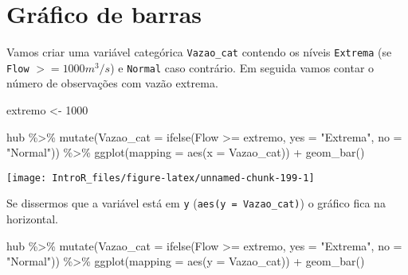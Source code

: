 \documentclass[
]{book}
\newenvironment{Shaded}{\begin{snugshade}}{\end{snugshade}}
\newcommand{\AttributeTok}[1]{\textcolor[rgb]{0.77,0.63,0.00}{#1}}
\newcommand{\DecValTok}[1]{\textcolor[rgb]{0.00,0.00,0.81}{#1}}
\newcommand{\FunctionTok}[1]{\textcolor[rgb]{0.00,0.00,0.00}{#1}}
\newcommand{\NormalTok}[1]{#1}
\newcommand{\OtherTok}[1]{\textcolor[rgb]{0.56,0.35,0.01}{#1}}
\newcommand{\SpecialCharTok}[1]{\textcolor[rgb]{0.00,0.00,0.00}{#1}}
\newcommand{\StringTok}[1]{\textcolor[rgb]{0.31,0.60,0.02}{#1}}
\begin{document}
\hypertarget{gruxe1fico-de-barras-2}{%
\section{Gráfico de barras}\label{gruxe1fico-de-barras-2}}

Vamos criar uma variável categórica \texttt{Vazao\_cat} contendo os níveis \texttt{Extrema} (se \texttt{Flow} \(>= 1000 m^3/s\)) e \texttt{Normal} caso contrário. Em seguida vamos contar o número de observações com vazão extrema.

\begin{Shaded}
\begin{Highlighting}[]
\NormalTok{extremo }\OtherTok{\textless{}{-}} \DecValTok{1000}

\NormalTok{hub }\SpecialCharTok{\%\textgreater{}\%} 
  \FunctionTok{mutate}\NormalTok{(}\AttributeTok{Vazao\_cat =} \FunctionTok{ifelse}\NormalTok{(Flow }\SpecialCharTok{\textgreater{}=}\NormalTok{ extremo, }
                            \AttributeTok{yes =} \StringTok{"Extrema"}\NormalTok{, }
                            \AttributeTok{no =} \StringTok{"Normal"}\NormalTok{)) }\SpecialCharTok{\%\textgreater{}\%} 
  \FunctionTok{ggplot}\NormalTok{(}\AttributeTok{mapping =} \FunctionTok{aes}\NormalTok{(}\AttributeTok{x =}\NormalTok{ Vazao\_cat)) }\SpecialCharTok{+}
  \FunctionTok{geom\_bar}\NormalTok{()}
\end{Highlighting}
\end{Shaded}

\begin{center}\texttt{[image: IntroR\_files/figure-latex/unnamed-chunk-199-1]} \end{center}

Se dissermos que a variável está em \texttt{y} (\texttt{aes(y\ =\ Vazao\_cat)}) o gráfico fica na horizontal.

\begin{Shaded}
\begin{Highlighting}[]
\NormalTok{hub }\SpecialCharTok{\%\textgreater{}\%} 
  \FunctionTok{mutate}\NormalTok{(}\AttributeTok{Vazao\_cat =} \FunctionTok{ifelse}\NormalTok{(Flow }\SpecialCharTok{\textgreater{}=}\NormalTok{ extremo, }\AttributeTok{yes =} \StringTok{"Extrema"}\NormalTok{, }\AttributeTok{no =} \StringTok{"Normal"}\NormalTok{)) }\SpecialCharTok{\%\textgreater{}\%} 
  \FunctionTok{ggplot}\NormalTok{(}\AttributeTok{mapping =} \FunctionTok{aes}\NormalTok{(}\AttributeTok{y =}\NormalTok{ Vazao\_cat)) }\SpecialCharTok{+}
  \FunctionTok{geom\_bar}\NormalTok{()}
\end{Highlighting}
\end{Shaded}
\end{document}
